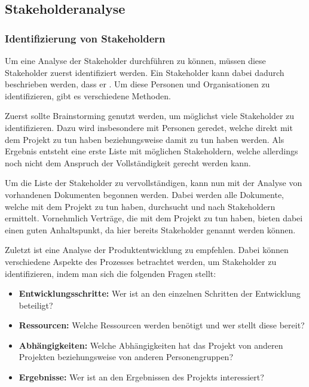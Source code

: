 \subsection{Stakeholderanalyse}\label{sec:stakeholderanalyse-teil-1}
\subsubsection{Identifizierung von Stakeholdern}
Um eine Analyse der Stakeholder durchführen zu können, müssen diese Stakeholder zuerst identifiziert werden.
Ein Stakeholder kann dabei dadurch beschrieben werden, dass er \autocite[Seite 8]{Maulhardt.a}.
Um diese Personen und Organisationen zu identifizieren, gibt es verschiedene Methoden.

Zuerst sollte Brainstorming genutzt werden, um möglichst viele Stakeholder zu identifizieren.
Dazu wird insbesondere mit Personen geredet, welche direkt mit dem Projekt zu tun haben beziehungsweise damit zu tun haben werden.
Als Ergebnis entsteht eine erste Liste mit möglichen Stakeholdern, welche allerdings noch nicht dem Anspruch der Vollständigkeit gerecht werden kann.

Um die Liste der Stakeholder zu vervollständigen, kann nun mit der Analyse von vorhandenen Dokumenten begonnen werden.
Dabei werden alle Dokumente, welche mit dem Projekt zu tun haben, durchsucht und nach Stakeholdern ermittelt.
Vornehmlich Verträge, die mit dem Projekt zu tun haben, bieten dabei einen guten Anhaltspunkt, da hier bereits Stakeholder genannt werden können.

Zuletzt ist eine Analyse der Produktentwicklung zu empfehlen.
Dabei können verschiedene Aspekte des Prozesses betrachtet werden, um Stakeholder zu identifizieren, indem man sich die folgenden Fragen stellt:

\begin{itemize}
    \item \textbf{Entwicklungsschritte:} Wer ist an den einzelnen Schritten der Entwicklung beteiligt?
    \item \textbf{Ressourcen:} Welche Ressourcen werden benötigt und wer stellt diese bereit?
    \item \textbf{Abhängigkeiten:} Welche Abhängigkeiten hat das Projekt von anderen Projekten beziehungsweise von anderen Personengruppen?
    \item \textbf{Ergebnisse:} Wer ist an den Ergebnissen des Projekts interessiert?
\end{itemize}


